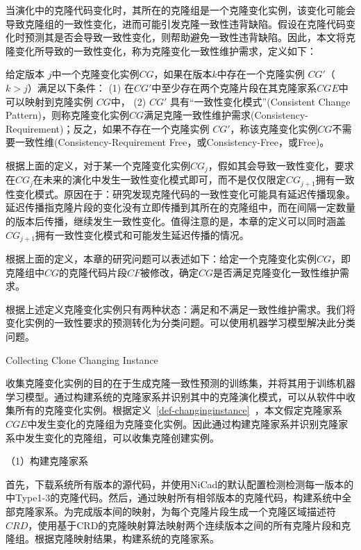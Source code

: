 当演化中的克隆代码变化时，其所在的克隆组是一个克隆变化实例，该变化可能会导致克隆组的一致性变化，进而可能引发克隆一致性违背缺陷。假设在克隆代码变化时预测其是否会导致一致性变化，则帮助避免一致性违背缺陷。因此，本文将克隆变化所导致的一致性变化，称为克隆变化一致性维护需求，定义如下：

\begin{definition}[克隆变化一致性维护需求] 
 \label{def-changingrequirement}
给定版本 $j$中一个克隆变化实例$CG$，如果在版本$k$中存在一个克隆实例 $CG'$（$k>j$）满足以下条件： (1) 在$CG'$中至少存在两个克隆片段在其克隆家系$CGE$中可以映射到克隆实例 $CG$中， (2) $CG'$ 具有“一致性变化模式”(Consistent Change Pattern)，则称克隆变化实例$CG$满足克隆一致性维护需求(Consistency-Requirement)；反之，如果不存在一个克隆实例 $CG'$，称该克隆变化实例$CG$不需要一致性维(Consistency-Requirement Free，或Consistency-Free，或Free)。
\end{definition}

根据上面的定义，对于某一个克隆变化实例$CG_j$，假如其会导致一致性变化，要求在$CG_j$在未来的演化中发生一致性变化模式即可，而不是仅仅限定$CG_{j+1}$拥有一致性变化模式。原因在于：研究发现克隆代码的一致性变化可能具有延迟传播现象\cite{barbour2011late,mondal2016comparative}。延迟传播指克隆片段的变化没有立即传播到其所在的克隆组中，而在间隔一定数量的版本后传播，继续发生一致性变化。值得注意的是，本章的定义可以同时涵盖$CG_{j+1}$拥有一致性变化模式和可能发生延迟传播的情况。

根据上面的定义，本章的研究问题可以表述如下：给定一个克隆变化实例$CG$，即克隆组中$CG$的克隆代码片段$CF$被修改，确定$CG$是否满足克隆变化一致性维护需求。

根据上述定义克隆变化实例只有两种状态：满足和不满足一致性维护需求。我们将变化实例的一致性要求的预测转化为分类问题。可以使用机器学习模型解决此分类问题。

{Collecting Clone Changing Instance}

收集克隆变化实例的目的在于生成克隆一致性预测的训练集，并将其用于训练机器学习模型。通过构建系统的克隆家系并识别其中的克隆演化模式，可以从软件中收集所有的克隆变化实例。根据定义~\ref{def-changinginstance}~，本文假定克隆家系$CGE$中发生变化的克隆组为克隆变化实例。因此通过构建克隆家系并识别克隆家系中发生变化的克隆组，可以收集克隆创建实例。

（1）构建克隆家系

首先，下载系统所有版本的源代码，并使用NiCad的默认配置检测检测每一版本的中Type1-3的克隆代码。然后，通过映射所有相邻版本的克隆代码，构建系统中全部克隆家系。为完成版本间的映射，为每个克隆片段生成一个克隆区域描述符 $CRD$\cite{duala2010clone}，使用基于CRD的克隆映射算法映射两个连续版本之间的所有克隆片段和克隆组\cite{ci2013new,ci2013newD}。根据克隆映射结果，构建系统的克隆家系。

